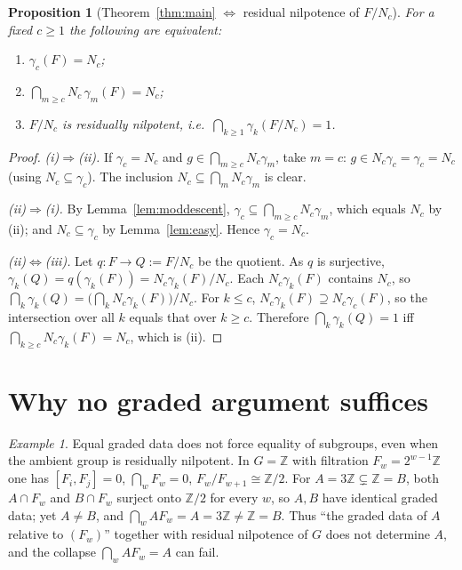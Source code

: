 \documentclass{amsart}
\newtheorem{proposition}{Proposition}
\theoremstyle{definition}
\theoremstyle{remark}
\newtheorem{example}{Example}
\begin{document}
\begin{proposition}[Theorem~\ref{thm:main} $\Leftrightarrow$ residual nilpotence of $F/N_c$]
\label{prop:equivresnilp}
For a fixed $c\ge1$ the following are equivalent:
\begin{enumerate}
\item[\textup{(i)}] $\gamma_c(F)=N_c$;
\item[\textup{(ii)}] $\bigcap_{m\ge c}N_c\,\gamma_m(F)=N_c$;
\item[\textup{(iii)}] $F/N_c$ is residually nilpotent, i.e.\ $\bigcap_{k\ge1}\gamma_k(F/N_c)=1$.
\end{enumerate}
\end{proposition}
\begin{proof}
\emph{(i)$\Rightarrow$(ii).} If $\gamma_c=N_c$ and $g\in\bigcap_{m\ge c}N_c\gamma_m$,
take $m=c$: $g\in N_c\gamma_c=\gamma_c=N_c$ (using $N_c\subseteq\gamma_c$). The
inclusion $N_c\subseteq\bigcap_m N_c\gamma_m$ is clear.

\emph{(ii)$\Rightarrow$(i).} By Lemma~\ref{lem:moddescent}, $\gamma_c\subseteq
\bigcap_{m\ge c}N_c\gamma_m$, which equals $N_c$ by (ii); and $N_c\subseteq\gamma_c$
by Lemma~\ref{lem:easy}. Hence $\gamma_c=N_c$.

\emph{(ii)$\Leftrightarrow$(iii).} Let $q\colon F\to Q:=F/N_c$ be the quotient. As
$q$ is surjective, $\gamma_k(Q)=q(\gamma_k(F))=N_c\gamma_k(F)/N_c$. Each
$N_c\gamma_k(F)$ contains $N_c$, so
$\bigcap_k\gamma_k(Q)=\big(\bigcap_k N_c\gamma_k(F)\big)/N_c$. For $k\le c$,
$N_c\gamma_k(F)\supseteq N_c\gamma_c(F)$, so the intersection over all $k$ equals that
over $k\ge c$. Therefore $\bigcap_k\gamma_k(Q)=1$ iff $\bigcap_{k\ge c}N_c\gamma_k(F)
=N_c$, which is (ii).
\end{proof}

\section{Why no graded argument suffices}\label{sec:why}

\begin{example}\label{ex:Z}
Equal graded data does not force equality of subgroups, even when the ambient group
is residually nilpotent. In $G=\mathbb Z$ with filtration $F_w=2^{w-1}\mathbb Z$ one
has $[F_i,F_j]=0$, $\bigcap_w F_w=0$, $F_w/F_{w+1}\cong\mathbb Z/2$. For
$A=3\mathbb Z\subsetneq\mathbb Z=B$, both $A\cap F_w$ and $B\cap F_w$ surject onto
$\mathbb Z/2$ for every $w$, so $A,B$ have identical graded data; yet $A\ne B$, and
$\bigcap_w A F_w=A=3\mathbb Z\ne\mathbb Z=B$. Thus ``the graded data of $A$ relative
to $(F_w)$'' together with residual nilpotence of $G$ does not determine $A$, and the
collapse $\bigcap_w AF_w=A$ can fail.
\end{example}
\end{document}
